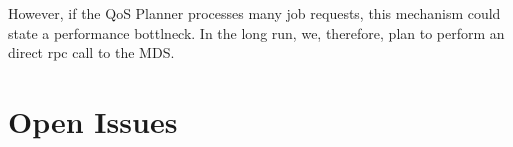 \documentclass[10pt]{article}
\begin{document}
However, if the QoS Planner processes many job requests, this mechanism could state a performance bottlneck. 
In the long run, we, therefore, plan to perform an direct rpc call to the MDS.





\section{Open Issues}
\end{document}
